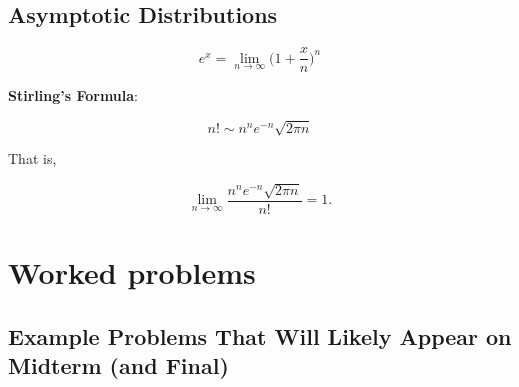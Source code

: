 \subsection{Asymptotic Distributions}

\begin{proposition}
\[
e^x = \lim_{n \to \infty} \bigg( 1 + \frac{x}{n}\bigg)^n
\]
\end{proposition}

\begin{theorem} \label{prob.stirling} \textbf{Stirling's Formula}: 

\[
n! \sim n^ne^{-n} \sqrt{2\pi n}
\]

That is,

\[
\lim_{n \to \infty} \frac {n^ne^{-n} \sqrt{2\pi n}}{n!} = 1.
\]
\end{theorem}

\section{Worked problems}

\subsection{Example Problems That Will Likely Appear on Midterm (and Final)}

